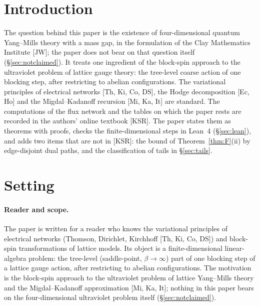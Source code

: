 \documentclass[11pt,a4paper]{article}
\theoremstyle{definition}
\theoremstyle{remark}
\begin{document}
\section{Introduction}\label{sec:intro}

The question behind this paper is the existence of four-dimensional quantum Yang--Mills theory with a mass gap, in the formulation of the Clay Mathematics Institute [JW]; the paper does not bear on that question itself (\S\ref{sec:notclaimed}).
It treats one ingredient of the block-spin approach to the ultraviolet problem of lattice gauge theory: the tree-level coarse action of one blocking step, after restricting to abelian configurations.
The variational principles of electrical networks [Th, Ki, Co, DS], the Hodge decomposition [Ec, Ho] and the Migdal--Kadanoff recursion [Mi, Ka, It] are standard.
The computations of the flux network and the tables on which the paper rests are recorded in the authors' online textbook [KSR].
The paper states them as theorems with proofs, checks the finite-dimensional steps in Lean~4 (\S\ref{sec:lean}), and adds two items that are not in [KSR]: the bound of Theorem~\ref{thm:F}(ii) by edge-disjoint dual paths, and the classification of tails in \S\ref{sec:tails}.

\section{Setting}\label{sec:setting}

\paragraph{Reader and scope.}
The paper is written for a reader who knows the variational principles of electrical networks (Thomson, Dirichlet, Kirchhoff [Th, Ki, Co, DS]) and block-spin transformations of lattice models.
Its object is a finite-dimensional linear-algebra problem: the tree-level (saddle-point, $\beta\to\infty$) part of one blocking step of a lattice gauge action, after restricting to abelian configurations.
The motivation is the block-spin approach to the ultraviolet problem of lattice Yang--Mills theory and the Migdal--Kadanoff approximation [Mi, Ka, It]; nothing in this paper bears on the four-dimensional ultraviolet problem itself (\S\ref{sec:notclaimed}).
\end{document}
